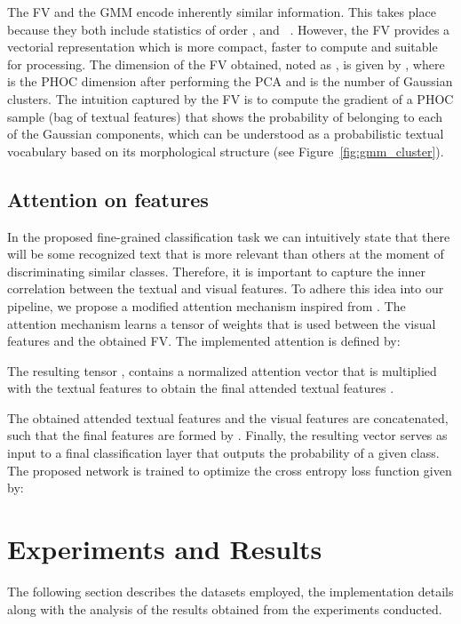 \documentclass[10pt,twocolumn,letterpaper]{article}
\begin{document}
The FV and the GMM encode inherently similar information. This takes place because they both include statistics of order ,  and ~\cite{sanchez2013image, perronnin2007fisher}. However, the FV provides a vectorial representation which is more compact, faster to compute and suitable for processing.
The dimension of the FV obtained, noted as , is given by , where  is the PHOC dimension after performing the PCA and  is the number of Gaussian clusters. The intuition captured by the FV is to compute the gradient of a PHOC sample (bag of textual features) that shows the probability of belonging to each of the Gaussian components, which can be understood as a probabilistic textual vocabulary based on its morphological structure (see Figure~\ref{fig:gmm_cluster}).




\subsection{Attention on features}
In the proposed fine-grained classification task we can intuitively state that there will be some recognized text that is more relevant than others at the moment of discriminating similar classes. 
Therefore, it is important to capture the inner correlation between the textual and visual features. 
To adhere this idea into our pipeline, we propose a modified attention mechanism inspired from \cite{you2016image}. The attention mechanism learns a tensor of weights  that is used between the visual features and the obtained FV. The implemented attention is defined by:



The resulting tensor , contains a normalized attention vector that is multiplied with the textual features  to obtain the final attended textual features .


The obtained attended textual features  and the visual features  are concatenated, such that the final features are formed by . Finally, the resulting vector serves as input to a final classification layer that outputs the probability of a given class.
The proposed network is trained to optimize the cross entropy loss function
given by:





\section{Experiments and Results}
\label{sec:Experiments}
The following section describes the datasets employed, the implementation details along with the analysis of the results obtained from the experiments conducted. 
\end{document}

